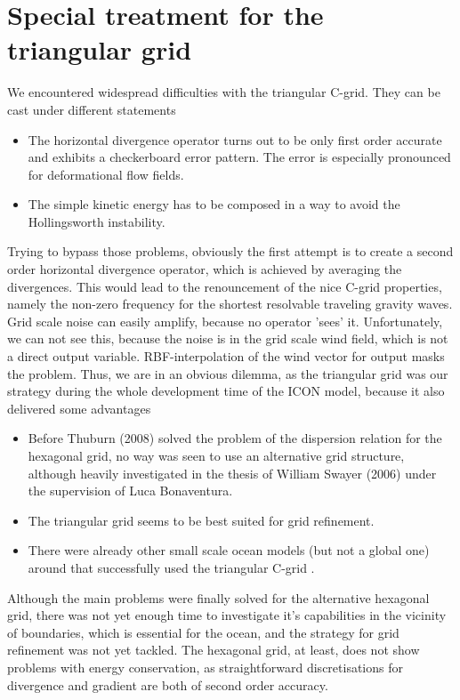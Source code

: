 \chapter{Special treatment for the triangular grid}

We encountered widespread difficulties with the triangular C-grid. They can be cast under
different statements
\begin{itemize}
 \item The horizontal divergence operator turns out to be only first order accurate and exhibits a
checkerboard error pattern. The error is especially pronounced for deformational flow fields.
 \item The simple kinetic energy has to be composed in a way to avoid the Hollingsworth instability.
\end{itemize}
Trying to bypass those problems, obviously the first attempt is to create a second order horizontal
divergence operator, which is achieved by averaging the divergences. This would lead to
the renouncement of the nice C-grid properties, namely the non-zero frequency for the
shortest resolvable traveling gravity waves. Grid scale noise can easily amplify, because
no operator 'sees' it. Unfortunately, we can not see this, because the noise is in the grid scale 
wind field, which is not a direct output variable. RBF-interpolation of the wind vector for output 
masks the problem. Thus, we are in an obvious dilemma, as the triangular grid was our strategy during 
the whole development time of the ICON model, because it also delivered some advantages
\begin{itemize}
 \item Before Thuburn (2008) solved the problem of the dispersion relation for the hexagonal grid, 
no way was seen to use an alternative grid structure, although heavily investigated in the thesis of
William Swayer (2006) under the supervision of Luca Bonaventura.
 \item The triangular grid seems to be best suited for grid refinement.
 \item There were already other small scale ocean models (but not a global one) around that 
successfully used the triangular C-grid .
\end{itemize}
Although the main problems were finally solved for the alternative hexagonal grid, there was not yet
enough time to investigate it's capabilities in the vicinity of boundaries, which is
essential for the ocean, and the strategy for grid refinement was not yet tackled.
The hexagonal grid, at least, does not show problems with energy conservation, as
straightforward discretisations for divergence and gradient are both of second order
accuracy.

